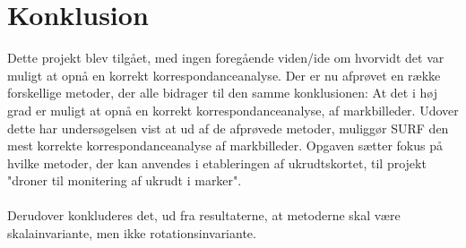 \chapter{Konklusion}
Dette projekt blev tilgået, med ingen foregående viden/ide om hvorvidt det var muligt at opnå en korrekt korrespondanceanalyse. Der er nu afprøvet en række forskellige metoder, der alle bidrager til den samme konklusionen: At det i høj grad er muligt at opnå en korrekt korrespondanceanalyse, af markbilleder. Udover dette har undersøgelsen vist at ud af de afprøvede metoder, muliggør SURF den mest korrekte korrespondanceanalyse af markbilleder. Opgaven sætter fokus på hvilke metoder, der kan anvendes i etableringen af ukrudtskortet, til projekt "droner til monitering af ukrudt i marker". \\ \\ 
Derudover konkluderes det, ud fra resultaterne, at metoderne skal være skalainvariante, men ikke rotationsinvariante.




